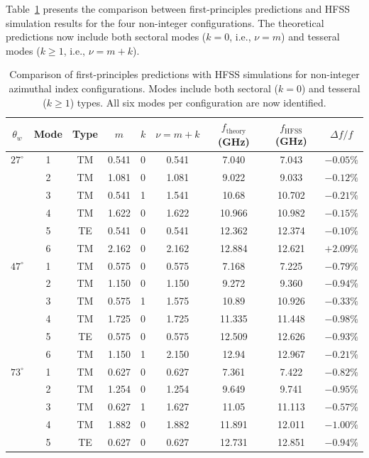 \documentclass[
  aip,
  amsmath,amssymb,
  preprint
]{revtex4-1}
\begin{document}
Table~\ref{tab:noninteger_results} presents the comparison between first-principles predictions and HFSS simulation results for the four non-integer configurations. The theoretical predictions now include both sectoral modes ($k = 0$, i.e., $\nu = m$) and tesseral modes ($k \geq 1$, i.e., $\nu = m + k$).
\begin{table}[htbp]
\centering
\caption{Comparison of first-principles predictions with HFSS simulations for non-integer azimuthal index configurations. Modes include both sectoral ($k=0$) and tesseral ($k \geq 1$) types. All six modes per configuration are now identified.}
\label{tab:noninteger_results}
\begin{tabular}{ccccccccc}
\hline
$\theta_w$ & Mode & Type & $m$ & $k$ & $\nu = m+k$ & $f_{\mathrm{theory}}$ (GHz) & $f_{\mathrm{HFSS}}$ (GHz) & $\Delta f/f$ \\
\hline
{$27^\circ$} 
& 1 & TM & 0.541 & 0 & 0.541 & 7.040 & 7.043 & $-0.05\%$ \\
& 2 & TM & 1.081 & 0 & 1.081 & 9.022 & 9.033 & $-0.12\%$ \\
& 3 & TM & 0.541 & 1 & 1.541 & 10.68 & 10.702 & $-0.21\%$ \\
& 4 & TM & 1.622 & 0 & 1.622 & 10.966 & 10.982 & $-0.15\%$ \\
& 5 & TE & 0.541 & 0 & 0.541 & 12.362 & 12.374 & $-0.10\%$ \\
& 6 & TM & 2.162 & 0 & 2.162 & 12.884 & 12.621 & $+2.09\%$ \\
\hline
{$47^\circ$} 
& 1 & TM & 0.575 & 0 & 0.575 & 7.168 & 7.225 & $-0.79\%$ \\
& 2 & TM & 1.150 & 0 & 1.150 & 9.272 & 9.360 & $-0.94\%$ \\
& 3 & TM & 0.575 & 1 & 1.575 & 10.89 & 10.926 & $-0.33\%$ \\
& 4 & TM & 1.725 & 0 & 1.725 & 11.335 & 11.448 & $-0.98\%$ \\
& 5 & TE & 0.575 & 0 & 0.575 & 12.509 & 12.626 & $-0.93\%$ \\
& 6 & TM & 1.150 & 1 & 2.150 & 12.94 & 12.967 & $-0.21\%$ \\
\hline
{$73^\circ$} 
& 1 & TM & 0.627 & 0 & 0.627 & 7.361 & 7.422 & $-0.82\%$ \\
& 2 & TM & 1.254 & 0 & 1.254 & 9.649 & 9.741 & $-0.95\%$ \\
& 3 & TM & 0.627 & 1 & 1.627 & 11.05 & 11.113 & $-0.57\%$ \\
& 4 & TM & 1.882 & 0 & 1.882 & 11.891 & 12.011 & $-1.00\%$ \\
& 5 & TE & 0.627 & 0 & 0.627 & 12.731 & 12.851 & $-0.94\%$ \\

\end{tabular}
\end{table}
\end{document}
